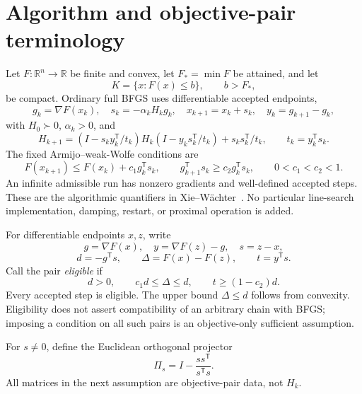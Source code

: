 \documentclass[10pt,oneside,openany]{book}
\theoremstyle{remark}\newtheorem{remark}{Remark}[chapter]
\begin{document}
\begingroup
\providecommand{\R}{}
\renewcommand{\R}{\mathbb R}
\providecommand{\tr}{}
\renewcommand{\tr}{\operatorname{tr}}
\providecommand{\diag}{}
\renewcommand{\diag}{\operatorname{diag}}
\providecommand{\Span}{}
\renewcommand{\Span}{\operatorname{span}}
\providecommand{\ip}{}
\renewcommand{\ip}[2]{\langle #1,#2\rangle}
\providecommand{\norm}{}
\renewcommand{\norm}[1]{\lVert #1\rVert}
\providecommand{\T}{}
\renewcommand{\T}{^{\mathsf T}}
\providecommand{\D}{}
\renewcommand{\D}{\mathcal D}
\setcounter{section}{1}
\setcounter{theorem}{0}
\setcounter{lemma}{0}
\setcounter{corollary}{0}
\setcounter{proposition}{0}
\setcounter{remark}{0}
\setcounter{equation}{2}
\section{Algorithm and objective-pair terminology}
Let $F:\R^n\to\R$ be finite and convex, let $F_*=\min F$ be attained, and let
\[
 K=\{x:F(x)\le b\},\qquad b>F_*,
\]
be compact. Ordinary full BFGS uses differentiable accepted endpoints,
\[
 g_k=\nabla F(x_k),\quad s_k=-\alpha_kH_kg_k,\quad
 x_{k+1}=x_k+s_k,\quad y_k=g_{k+1}-g_k,
\]
with $H_0\succ0$, $\alpha_k>0$, and
\[
 H_{k+1}=(I-s_ky_k\T/t_k)H_k(I-y_ks_k\T/t_k)+s_ks_k\T/t_k,
 \qquad t_k=y_k\T s_k.
\]
The fixed Armijo--weak-Wolfe conditions are
\[
 F(x_{k+1})\le F(x_k)+c_1g_k\T s_k,\qquad
 g_{k+1}\T s_k\ge c_2g_k\T s_k,\qquad 0<c_1<c_2<1.
\]
An infinite admissible run has nonzero gradients and well-defined accepted steps. These are the algorithmic quantifiers in Xie--W\"achter~\cite{XW}. No particular line-search implementation, damping, restart, or proximal operation is added.

For differentiable endpoints $x,z$, write
\[
 g=\nabla F(x),\quad y=\nabla F(z)-g,\quad s=z-x,
\]
\[
 d=-g\T s,\qquad \Delta=F(x)-F(z),\qquad t=y\T s.
\]
Call the pair \emph{eligible} if
\begin{equation}
 d>0,\qquad c_1d\le\Delta\le d,\qquad t\ge(1-c_2)d. \tag{T.2}
\end{equation}
Every accepted step is eligible. The upper bound $\Delta\le d$ follows from convexity. Eligibility does not assert compatibility of an arbitrary chain with BFGS; imposing a condition on all such pairs is an objective-only sufficient assumption.

For $s\ne0$, define the Euclidean orthogonal projector
\[
 \Pi_s=I-\frac{ss\T}{s\T s}.
\]
All matrices in the next assumption are objective-pair data, not $H_k$.


\setcounter{section}{2}
\setcounter{theorem}{0}
\setcounter{lemma}{0}
\setcounter{corollary}{0}
\setcounter{proposition}{0}
\setcounter{remark}{0}
\setcounter{equation}{3}
\end{document}
